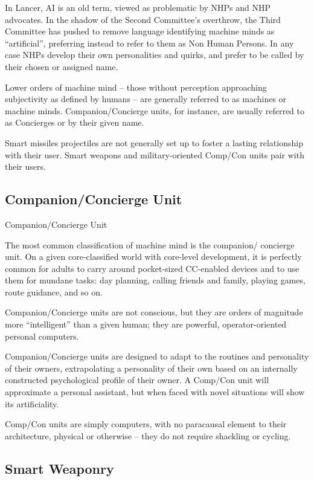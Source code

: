 In Lancer, AI is an old term, viewed as problematic by NHPs and NHP advocates. In the shadow
of the Second Committee’s overthrow, the Third Committee has pushed to remove language
identifying machine minds as “artificial”, preferring instead to refer to them as Non Human
Persons. In any case NHPs develop their own personalities and quirks, and prefer to be called by
their chosen or assigned name.


Lower orders of machine mind -- those without perception approaching subjectivity as defined
by humans -- are generally referred to as machines or machine minds. Companion/Concierge
units, for instance, are usually referred to as Concierges or by their given name.


Smart missiles projectiles are not generally set up to foster a lasting relationship with their user.
Smart weapons and military-oriented Comp/Con units pair with their users.

\subsection{Companion/Concierge Unit}
Companion/Concierge Unit

The most common classification of machine mind is the companion/ concierge unit. On a given
core-classified world with core-level development, it is perfectly common for adults to carry
around pocket-sized CC-enabled devices and to use them for mundane tasks: day planning,
calling friends and family, playing games, route guidance, and so on.


Companion/Concierge units are not conscious, but they are orders of magnitude more
“intelligent” than a given human; they are powerful, operator-oriented personal computers.


Companion/Concierge units are designed to adapt to the routines and personality of their
owners, extrapolating a personality of their own based on an internally constructed psychological
profile of their owner. A Comp/Con unit will approximate a personal assistant, but when faced
with novel situations will show its artificiality.


Comp/Con units are simply computers, with no paracausal element to their architecture, physical
or otherwise -- they do not require shackling or cycling.



\subsection{Smart Weaponry  }

